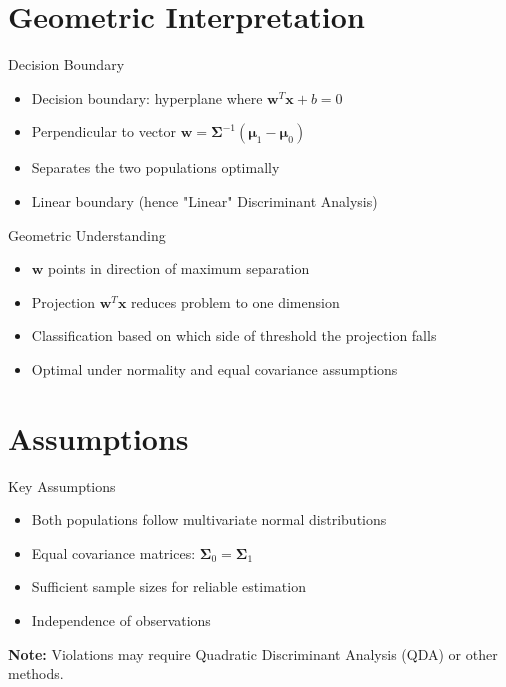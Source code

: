 \documentclass[aspectratio=169]{beamer}
\begin{document}
\section{Geometric Interpretation}
\begin{frame}{Decision Boundary}
  \begin{itemize}
    \item Decision boundary: hyperplane where $\mathbf{w}^T \mathbf{x} + b = 0$
    \item Perpendicular to vector $\mathbf{w} = \boldsymbol{\Sigma}^{-1}(\boldsymbol{\mu}_1 - \boldsymbol{\mu}_0)$
    \item Separates the two populations optimally
    \item Linear boundary (hence "Linear" Discriminant Analysis)
  \end{itemize}
\end{frame}

\begin{frame}{Geometric Understanding}
  \begin{itemize}
    \item $\mathbf{w}$ points in direction of maximum separation
    \item Projection $\mathbf{w}^T \mathbf{x}$ reduces problem to one dimension
    \item Classification based on which side of threshold the projection falls
    \item Optimal under normality and equal covariance assumptions
  \end{itemize}
\end{frame}

\section{Assumptions}
\begin{frame}{Key Assumptions}
  \begin{itemize}
    \item Both populations follow multivariate normal distributions
    \item Equal covariance matrices: $\boldsymbol{\Sigma}_0 = \boldsymbol{\Sigma}_1$
    \item Sufficient sample sizes for reliable estimation
    \item Independence of observations
  \end{itemize}
  
  \vspace{0.5cm}
  \textbf{Note:} Violations may require Quadratic Discriminant Analysis (QDA) or other methods.
\end{frame}
\end{document}
